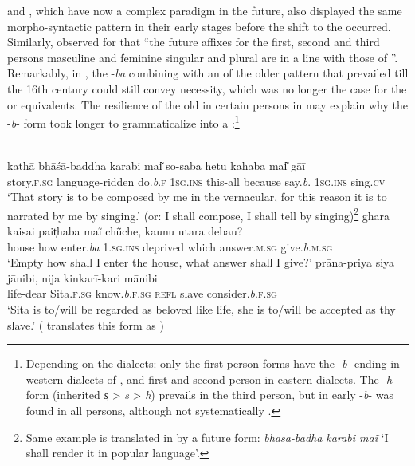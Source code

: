 \documentclass[output=paper]{langsci/langscibook}
\begin{document}
 and , which have now a complex paradigm in the future, also displayed the same morpho-syntactic pattern in their early stages before the shift to the  occurred. Similarly, \citet[171]{Tiwari1966} observed for  that “the future affixes for the first, second and third persons masculine and feminine singular and plural are in a line with those of ”. Remarkably, in , the -\textit{ba}  combining with an  of the older pattern that prevailed till the 16th century could still convey necessity, which was no longer the case for the  or  equivalents. The resilience of the old  in certain persons in  may explain why the -\textit{b}- form took longer to grammaticalize into a :\footnote{Depending on the dialects: only the first person forms have the -\textit{b}{}- ending in western dialects of , and first and second person in eastern dialects. The -\textit{h} form (inherited  \textit{s̩} > \textit{s} > \textit{h}) prevails in the third person, but in early  -\textit{b}{}- was found in all persons, although not systematically \citep[264--266]{Saxena1937}.} 

\ea\label{ex:23}
\ea 
{}\\
\gll kathā           bhāśā-baddha       karabi                     mai͂               so-saba hetu     kahaba mai͂        gāī\\
story.\textsc{f.sg}  language-ridden    do.\textit{b}.\textsc{f}  \textsc{1sg.ins}   this-all because   say.\textit{b}. \textsc{1sg.ins}  sing.\textsc{cv} \\
\glt ‘That story is to be composed by me in the vernacular, for this reason it is to narrated by me by singing.’ (or: I shall compose, I shall tell by singing)\footnote{Same example is translated in \citet[260]{Saxena1937} by a future form: \textit{bhasa-badha karabi maĩ} `I shall render it in popular language'.}   
\ex 
\gll ghara  kaisai  pait̩haba   maĩ       ch\~{ū}che, kaunu utara  debau?\\
house  how  enter.\textit{ba}   \textsc{1.sg.ins}  deprived   which answer.\textsc{m.sg}    give.\textit{b}.\textsc{m.sg} \\
\glt ‘Empty how shall I enter the house, what answer shall I give?’ \citep[261]{Saxena1937}
\ex 
\gll prāna-priya  siya  jānibi,          nija  kinkarī-kari  mānibi\\
life-dear  Sita.\textsc{f.sg}   know.\textit{b}.\textsc{f.sg} \textsc{refl} slave      consider.\textit{b}.\textsc{f.sg} \\
\glt ‘Sita is to/will be regarded as beloved like life, she is to/will be accepted as thy slave.’ (\citet[96]{Chatterji1986} translates this form as )
\z 
\z 
\end{document}
